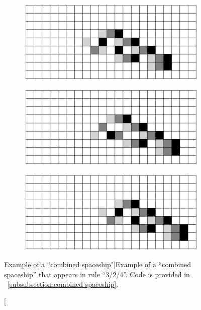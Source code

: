 \documentclass[12pt]{article}
\numberwithin{figure}{section} %
\begin{document}
\begin{figure}[H]
\begin{subfigure}{0.45\textwidth}
     		\subcaption{}
   	\end{subfigure}
    	\begin{subfigure}{0.45\textwidth}
     		\includegraphics[width=\linewidth]{Section4/35.9}
     		\subcaption{}
   	\end{subfigure}
	\newline
	\begin{subfigure}{0.45\textwidth}
     		\includegraphics[width=\linewidth]{Section4/35.10}
     		\subcaption{}
   	\end{subfigure}
    	\begin{subfigure}{0.45\textwidth}
     		\includegraphics[width=\linewidth]{Section4/35.11}
     		\subcaption{}
   	\end{subfigure}
   	\caption[Example of a “combined spaceship"]{Example of a “combined spaceship” that appears in rule “3/2/4”. Code is provided in ~\ref{subsubsection:combined spaceship}.}
   	\label{fig:combined spaceship}
\end{figure}
\end{document}
